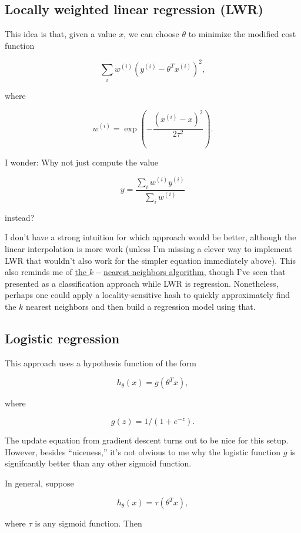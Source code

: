 \documentclass[]{article}
\begin{document}
\subsection{Locally weighted linear regression
(LWR)}\label{locally-weighted-linear-regression-lwr}

This idea is that, given a value \(x\), we can choose \(\theta\) to
minimize the modified cost function

\[\sum_i w^{(i)}(y^{(i)}-\theta^Tx^{(i)})^2,\]

where

\[w^{(i)} = \exp\left(-\frac{(x^{(i)}-x)^2}{2\tau^2}\right).\]

I wonder: Why not just compute the value

\[y = \frac{\sum_i w^{(i)}y^{(i)}}{\sum_i w^{(i)}}\]

instead?

I don't have a strong intuition for which approach would be better,
although the linear interpolation is more work (unless I'm missing a
clever way to implement LWR that wouldn't also work for the simpler
equation immediately above). This also reminds me of
\href{https://en.wikipedia.org/wiki/K-nearest_neighbors_algorithm}{the
\(k-\)nearest neighbors algorithm}, though I've seen that presented as a
classification approach while LWR is regression. Nonetheless, perhaps
one could apply a locality-sensitive hash to quickly approximately find
the \(k\) nearest neighbors and then build a regression model using
that.

\subsection{Logistic regression}\label{logistic-regression}

This approach uses a hypothesis function of the form

\renewcommand{\th}{\theta}

\[h_\th(x) = g(\th^Tx),\]

where

\[g(z) = 1/(1+e^{-z}).\]

The update equation from gradient descent turns out to be nice for this
setup. However, besides ``niceness,'' it's not obvious to me why the
logistic function \(g\) is signifcantly better than any other sigmoid
function.

In general, suppose

\[h_\th(x) = \tau(\th^Tx),\]

where \(\tau\) is any sigmoid function. Then
\end{document}
